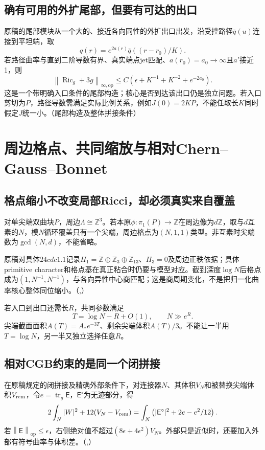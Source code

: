 \documentclass[UTF8,fontset=fandol,zihao=-4]{ctexart}
\theoremstyle{research}
\DeclareMathOperator{\Ric}{Ric}
\DeclareMathOperator{\tr}{tr}
\newcommand{\Z}{\mathbb Z}
\newcommand{\op}{\mathrm{op}}
\newcommand{\norm}[1]{\left\|#1\right\|}
\numberwithin{equation}{section}
\begin{document}
\subsection{确有可用的外扩尾部，但要有可达的出口}
原稿的尾部模块从一个大的、接近各向同性的外扩出口出发，沿受控路径$\bar q(u)$连接到平坦端，取
\[
q(r)=e^{2a(r)}\bar q((r-r_0)/K).
\]
若路径曲率与直到二阶导数有界、真实端点jet匹配、$a(r_0)=a_0\to\infty$且$a'$接近1，则
\[
\norm{\Ric_g+3g}_{\infty,\op}
\le C(\epsilon+K^{-1}+K^{-2}+e^{-2a_0}).
\]
这是一个带明确入口条件的尾部构造；核心是否到达该出口仍是独立问题。若入口剪切为$P$，路径导数需满足实际比例关系，例如$J(0)=2KP$，不能任取长$K$同时假定$J$统一小。\cite{G}（尾部构造及整体拼接条件）

\section{周边格点、共同缩放与相对Chern--Gauss--Bonnet}
\subsection{格点缩小不改变局部Ricci，却必须真实来自覆盖}
对单尖端双曲块$P$，周边$\Lambda\cong\Z^3$。若本原$\phi:\pi_1(P)\to\Z$在周边像为$d\Z$，取与$d$互素的$N$，模$N$循环覆盖只有一个尖端，周边格点为$(N,1,1)$类型。非互素时尖端数为$\gcd(N,d)$，不能省略。

原稿对具体$24cdc1.1$记录$H_1=\Z\oplus\Z_3\oplus\Z_{13}$、$H_3=0$及周边正秩依据；具体primitive character和格点基在真正粘合时仍要与模型对应。截到深度$\log N$后格点成为$(1,N^{-1},N^{-1})$，与各向异性中心商匹配；这是商周期变化，不是把归一化曲率核心整体同位缩小。\cite{G}（,）\cite{RT24}

若入口到出口还需长$R$，共同参数满足
\[
T=\log N-R+O(1),\qquad N\gg e^R.
\]
尖端截面面积$A(T)=A_*e^{-3T}$、剩余尖端体积$A(T)/3$。不能让一半用$T=\log N$，另一半又独立选择任意$R$。

\subsection{相对CGB约束的是同一个闭拼接}
在原稿规定的闭拼接及精确外部条件下，对连接器$N$、其体积$V_N$和被替换尖端体积$V_{\rm rem}$，令$e=\tr_g\mathsf E$，$\mathsf E^\circ$为无迹部分，得
\begin{equation}\label{eq:relativeCGB}
2\int_N|W|^2+12(V_N-V_{\rm rem})
=\int_N\left(|\mathsf E^\circ|^2+2e-e^2/12\right).
\end{equation}
若$\norm{\mathsf E}_\op\le\epsilon$，右侧绝对值不超过$(8\epsilon+4\epsilon^2)V_N$。外部只是近似时，还要加入外部有符号曲率与体积差。\cite{G}（,）
\end{document}
